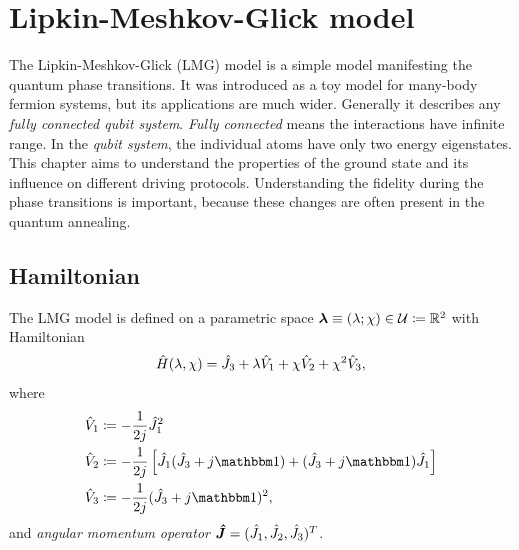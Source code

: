 \chapter{Lipkin-Meshkov-Glick model}
\label{chap:lipkin}

The Lipkin-Meshkov-Glick (LMG) model is a simple model manifesting the quantum phase transitions. It was introduced as a toy model for many-body fermion systems, but its applications are much wider. Generally it describes any \emph{fully connected qubit system}. \emph{Fully connected} means the interactions have infinite range. In the \emph {qubit system}, the individual atoms have only two energy eigenstates. This chapter aims to understand the properties of the ground state and its influence on different driving protocols. Understanding the fidelity during the phase transitions is important, because these changes are often present in the quantum annealing.

\section{Hamiltonian}
The LMG model is defined on a parametric space ${\bm\lambda}\equiv (\lambda;\chi)\in\mathcal U\coloneqq \mathbb{R}^2$ with Hamiltonian
\begin{equation}
    \hat{H}(\lambda,\chi)=\hat{J}_3+\lambda\hat V_1 +\chi \hat V_2+\chi^2 \hat V_3,
    \label{eq:firstOrderTransitionHamiltonian}
\end{equation}
where
\begin{align}
    \hat V_1 &\coloneqq-\frac{1}{2j}\J_1^2\\
    \hat V_2 &\coloneqq -\frac{1}{2j}\left[\J_1(\J_3+j\Id)+(\J_3+j\Id)\J_1\right]\\
    \hat V_3 &\coloneqq -\frac{1}{2j}(\J_3+j\Id)^2,
\end{align}
and \emph{angular momentum operator} $\bm{\hat{J}}=(\hat{J}_1,\hat{J}_2,\hat{J}_3)^T$.

